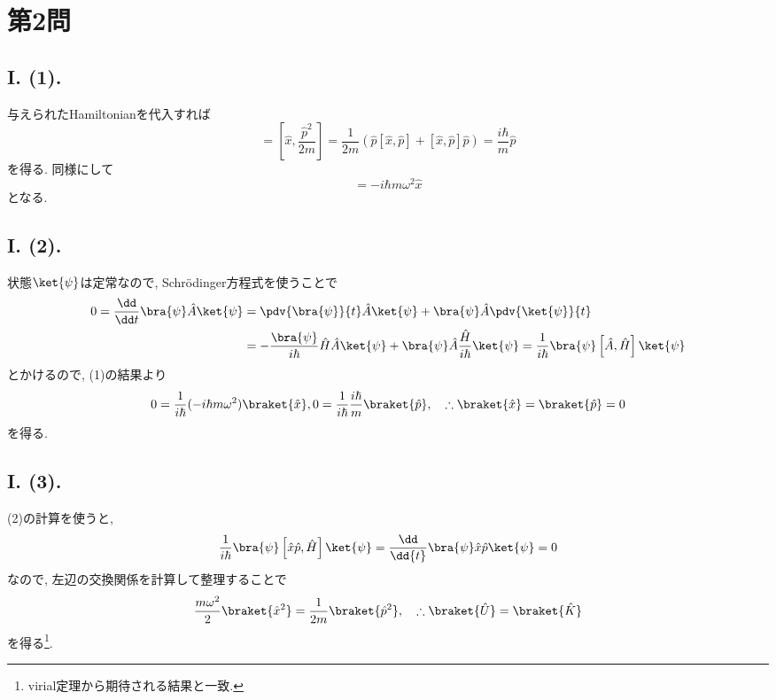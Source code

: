 
\section*{第2問}

\subsection*{I. (1). }
与えられたHamiltonianを代入すれば
\begin{equation}
  [\hat{x}, \hat{H}] = \left[ \hat{x}, \frac{\hat{p}^2}{2m} \right]
  = \frac{1}{2m} \left( \hat{p} [\hat{x},\hat{p}] + [\hat{x}, \hat{p}] \hat{p} \right)
  = \frac{i\hbar}{m} \hat{p}
\end{equation}
を得る. 
同様にして
\begin{equation}
  [\hat{p}, \hat{H}]=-i\hbar m\omega^2\hat{x}
\end{equation}
となる. 

\subsection*{I. (2). }
状態$\ket{\psi}$は定常なので, Schr\"{o}dinger方程式を使うことで
\begin{align*}
  0=\frac{\dd}{\dd t}\bra{\psi}\hat{A}\ket{\psi}&=\pdv{\bra{\psi}}{t}\hat{A}\ket{\psi}+\bra{\psi}\hat{A}\pdv{\ket{\psi}}{t}\\
  &=-\frac{\bra{\psi}}{i\hbar}\hat{H}\hat{A}\ket{\psi}+\bra{\psi}\hat{A}\frac{\hat{H}}{i\hbar}\ket{\psi}
  =\frac{1}{i\hbar}\bra{\psi}\left[ \hat{A},\hat{H} \right]\ket{\psi}
\end{align*}
とかけるので, (1)の結果より
\begin{equation}
  0=\frac{1}{i\hbar}(-i\hbar m\omega^2)\braket{\hat{x}}, 0=\frac{1}{i\hbar}\frac{i\hbar}{m}\braket{\hat{p}}, \quad\therefore \braket{\hat{x}}=\braket{\hat{p}}=0
\end{equation}
を得る. 

\subsection*{I. (3). }
(2)の計算を使うと, 
\begin{equation}
  \frac{1}{i\hbar}\bra{\psi}\left[ \hat{x}\hat{p},\hat{H} \right]\ket{\psi}=\frac{\dd}{\dd{t}}\bra{\psi}\hat{x}\hat{p}\ket{\psi}=0
\end{equation}
なので, 左辺の交換関係を計算して整理することで
\begin{equation}
  \frac{m\omega^2}{2}\braket{\hat{x}^2}=\frac{1}{2m}\braket{\hat{p}^2}, \quad\therefore \braket{\hat{U}}=\braket{\hat{K}}
\end{equation}
を得る\footnote{virial定理から期待される結果と一致. }. 

